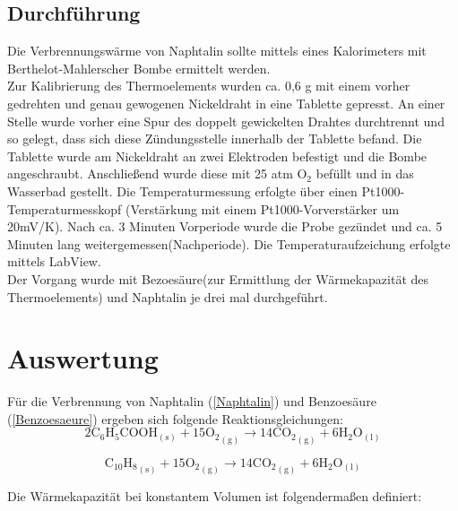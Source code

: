 \documentclass[12pt,a4paper,titlepage,headinclude,bibtotoc]{scrartcl}
\begin{document}
\subsection{Durchführung}
Die Verbrennungswärme von Naphtalin sollte mittels eines Kalorimeters mit Berthelot-Mahlerscher Bombe ermittelt werden.\\
Zur Kalibrierung des Thermoelements wurden ca. 0,6 g mit einem vorher gedrehten und genau gewogenen Nickeldraht in eine Tablette gepresst. An einer Stelle wurde vorher eine Spur des doppelt gewickelten Drahtes durchtrennt und so gelegt, dass sich diese Zündungsstelle innerhalb der Tablette befand. Die Tablette wurde am Nickeldraht an zwei Elektroden befestigt und die Bombe angeschraubt. Anschließend wurde diese mit 25 atm O$_2$ befüllt und in das Wasserbad gestellt.  Die Temperaturmessung erfolgte über einen Pt1000-\,Temperaturmesskopf (Verstärkung mit einem Pt1000-Vorverstärker um 20mV/K). Nach ca. 3 Minuten Vorperiode wurde die Probe gezündet und ca. 5 Minuten lang weitergemessen(Nachperiode).
Die Temperaturaufzeichung erfolgte mittels LabView.\\
Der Vorgang wurde mit Bezoesäure(zur Ermittlung der Wärmekapazität des Thermoelements) und Naphtalin je drei mal durchgeführt.\\ 

\section{Auswertung}

Für die Verbrennung von Naphtalin (\ref{Naphtalin}) und Benzoesäure (\ref{Benzoesaeure}) ergeben sich folgende Reaktionsgleichungen:\\

\begin{equation}\label{Benzoesaeure}
2\mathrm{C_6}\mathrm{H}_5\mathrm{COOH}_\mathrm{(s)} + 15{\mathrm{O}_2}_\mathrm{(g)} \rightarrow 14{\mathrm{CO}_2}_\mathrm{(g)} +6\mathrm{H}_2\mathrm{O}_\mathrm{(l)}
\end{equation}

\begin{equation}\label{Naphtalin}
{\mathrm{C}_{10}\mathrm{H}_8}_\mathrm{(s)} + 15{\mathrm{O}_2}_\mathrm{(g)} \rightarrow 14 {\mathrm{CO}_2}_\mathrm{(g)} + 6\mathrm{H}_2\mathrm{O}_\mathrm{(l)}
\end{equation}

Die Wärmekapazität bei konstantem Volumen ist folgendermaßen definiert:\\
\end{document}
